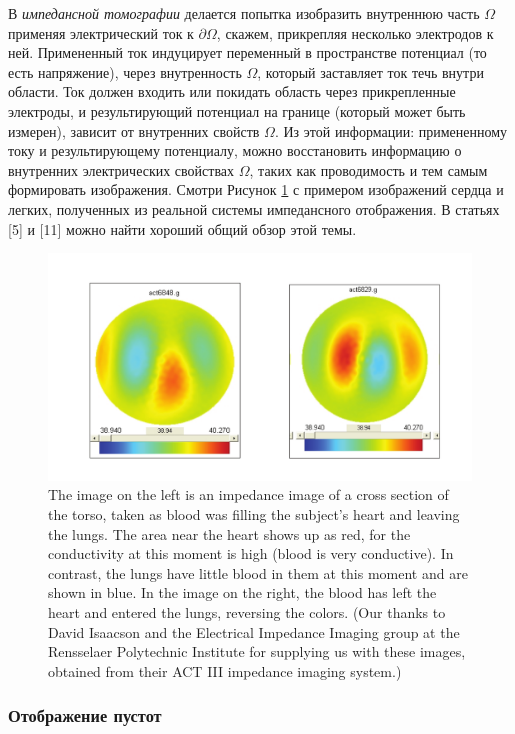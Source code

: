 \documentclass[a4paper, 12pt]{article}
\begin{document}
В \textit{импедансной томографии} делается попытка изобразить внутреннюю часть $\Omega$ применяя электрический ток к $\partial \Omega$, скажем, прикрепляя несколько электродов к ней. Примененный ток индуцирует переменный в пространстве потенциал (то есть напряжение), через внутренность $\Omega$, который заставляет ток течь внутри области. Ток должен входить или покидать область через прикрепленные электроды, и результирующий потенциал на границе (который может быть измерен), зависит от внутренних свойств $\Omega$. Из этой информации: примененному току и результирующему потенциалу, можно восстановить информацию о внутренних электрических свойствах $\Omega$, таких как проводимость и тем самым формировать изображения. Смотри Рисунок \ref{fig:2} с примером изображений сердца и легких, полученных из реальной системы импедансного отображения. В статьях [5] и [11] можно найти хороший общий обзор этой темы.
\begin{figure}[t]
  \centering
  \includegraphics[height=0.15\paperheight]{2.png}
  \caption{The image on the left is an impedance image of a cross
    section of the torso, taken as blood was filling the subject’s
    heart and leaving the lungs. The area near the heart shows up as
    red, for the conductivity at this moment is high (blood is very
    conductive). In contrast, the lungs have little blood in them at
    this moment and are shown in blue. In the image on the right, the
    blood has left the heart and entered the lungs, reversing the
    colors. (Our thanks to David Isaacson and the Electrical Impedance
    Imaging group at the Rensselaer Polytechnic Institute for
    supplying us with these images, obtained from their ACT III
    impedance imaging system.)}
  \label{fig:2}
\end{figure}

\subsubsection{Отображение пустот}
\end{document}
